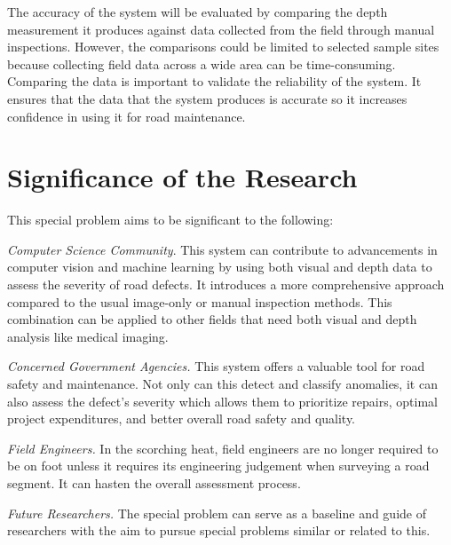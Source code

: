 The accuracy of the system will be evaluated by comparing the depth measurement it produces against data collected from the field through manual inspections. However, the comparisons could be limited to selected sample sites because collecting field data across a wide area can be time-consuming. Comparing the data is important to validate the reliability of the system. It ensures that the data that the system produces is accurate so it increases confidence in using it for road maintenance. 


\section{Significance of the Research}
\label{sec:significance}

This special problem aims to be significant to the following:


\textit{Computer Science Community}. This system can contribute to advancements in computer vision and machine learning by using both visual and depth data to assess the severity of road defects. It introduces a more comprehensive approach compared to the usual image-only or manual inspection methods. This combination can be applied to other fields that need both visual and depth analysis like medical imaging. 


\textit{Concerned Government Agencies.} This system offers a valuable tool for road safety and maintenance. Not only can this detect and classify anomalies, it can also assess the defect’s severity which allows them to prioritize repairs, optimal project expenditures, and better overall road safety and quality. 


\textit{Field Engineers.} In the scorching heat, field engineers are no longer required to be on foot unless it requires its engineering judgement when surveying a road segment. It can hasten the overall assessment process. 


\textit{Future Researchers.} The special problem can serve as a baseline and guide of researchers with the aim to pursue special problems similar or related to this. 


